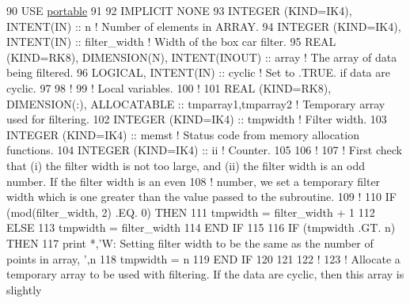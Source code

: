 \begin{DoxyCode}
90 \textcolor{keywordtype}{USE }\hyperlink{namespaceportable}{portable}
91 
92 \textcolor{keywordtype}{IMPLICIT NONE}
93 \textcolor{keywordtype}{INTEGER (KIND=IK4)}, \textcolor{keywordtype}{INTENT(IN)}                      :: n            \textcolor{comment}{! Number of elements in ARRAY.}
94 \textcolor{keywordtype}{INTEGER (KIND=IK4)}, \textcolor{keywordtype}{INTENT(IN)}                      :: filter\_width \textcolor{comment}{! Width of the box car filter.}
95 \textcolor{keywordtype}{REAL (KIND=RK8)}, \textcolor{keywordtype}{DIMENSION(N)}, \textcolor{keywordtype}{INTENT(INOUT)}        :: array        \textcolor{comment}{! The array of data being filtered.}
96 \textcolor{keywordtype}{LOGICAL}, \textcolor{keywordtype}{INTENT(IN)}                                 :: cyclic       \textcolor{comment}{! Set to .TRUE. if data are cyclic.}
97 
98 \textcolor{comment}{!}
99 \textcolor{comment}{! Local variables.}
100 \textcolor{comment}{!}
101 \textcolor{keywordtype}{REAL (KIND=RK8)}, \textcolor{keywordtype}{DIMENSION(:)}, \textcolor{keywordtype}{ALLOCATABLE}          :: tmparray1,tmparray2     \textcolor{comment}{! Temporary array used for
       filtering.}
102 \textcolor{keywordtype}{INTEGER (KIND=IK4)}                                  :: tmpwidth     \textcolor{comment}{! Filter width.}
103 \textcolor{keywordtype}{INTEGER (KIND=IK4)}                                  :: memst        \textcolor{comment}{! Status code from memory allocation
       functions.}
104 \textcolor{keywordtype}{INTEGER (KIND=IK4)}                                  :: ii           \textcolor{comment}{! Counter.}
105 
106 \textcolor{comment}{!}
107 \textcolor{comment}{! First check that (i) the filter width is not too large, and (ii) the filter width is an odd number. If
       the filter width is an even}
108 \textcolor{comment}{! number, we set a temporary filter width which is one greater than the value passed to the subroutine.}
109 \textcolor{comment}{!}
110 \textcolor{keywordflow}{IF} (mod(filter\_width, 2) .EQ. 0) \textcolor{keywordflow}{THEN}
111     tmpwidth    = filter\_width + 1
112 \textcolor{keywordflow}{ELSE}
113     tmpwidth    = filter\_width
114 \textcolor{keywordflow}{END IF}
115 
116 \textcolor{keywordflow}{IF} (tmpwidth .GT. n) \textcolor{keywordflow}{THEN}
117     print *,\textcolor{stringliteral}{'W: Setting filter width to be the same as the number of points in array, '},n
118     tmpwidth    = n
119 \textcolor{keywordflow}{END IF}
120 
121 
122 \textcolor{comment}{!}
123 \textcolor{comment}{! Allocate a temporary array to be used with filtering. If the data are cyclic, then this array is slightly
}
\end{DoxyCode}
